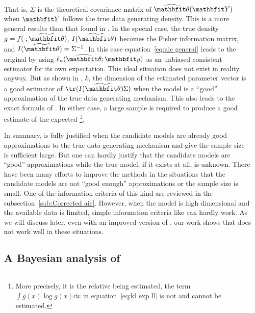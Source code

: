 That is, $\Sigma$ is the theoretical covariance matrix of $\hbth(\bfY)$ when
$\bfY$ follows the true data generating density. This is a more general
results than that found in \textcite{Akaike1973}. In the special case, the
true density $g = f(\cdot;\tbth)$, $I(\tbth)$ becomes the Fisher information
matrix, and $I(\tbth) = \Sigma^{-1}$. In this case equation~\eqref{eq:aic
  general} leads to the original \aic by using $\ell_n(\hbth;\bfy)$ as an
unbiased consistent estimator for its own expectation. This ideal situation
does not exist in reality anyway. But as shown in \textcite{Shibata1989}, $k$,
the dimension of the estimated parameter vector is a good estimator of
$\tr(I(\tbth)\Sigma)$ when the model is a ``good'' approximation of the true
data generating mechanism. This also leads to the exact formula of \aic. In
either case, a large sample is required to produce a good estimate of the
expected \kl\footnote{More precisely, it is the relative \kl being estimated,
  the term $\int g(x)\log g(x)\dd x$ in equation~\eqref{eq:kl exp ll} is not
  and cannot be estimated.}.

In summary, \aic is fully justified when the candidate models are already good
approximations to the true data generating mechanism and give the sample size
is sufficient large. But one can hardly justify that the candidate models are
``good'' approximations while the true model, if it exists at all, is unknown.
There have been many efforts to improve the \aic methods in the situations
that the candidate models are not ``good enough'' approximations or the sample
size is small. One of the information criteria of this kind are reviewed in
the subsection~\ref{sub:Corrected aic}. However, when the model is high
dimensional and the available data is limited, simple information criteria
like \aic can hardly work. As we will discuss later, even with an improved
version of \aic, our work shows that \aic does not work well in these
situations.

\subsection{A Bayesian analysis of \protect\aic}
\label{sub:A Bayesian analysis of aic}

